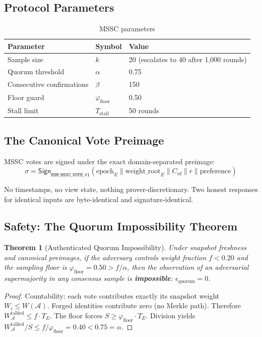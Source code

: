 \documentclass[11pt, a4paper]{article}
\newtheorem{theorem}{Theorem}
\begin{document}
\subsection{Protocol Parameters}

\begin{table}[h]
\centering
\caption{MSSC parameters}
\begin{tabular}{lll}
\toprule
\textbf{Parameter} & \textbf{Symbol} & \textbf{Value} \\
\midrule
Sample size & $k$ & 20 (escalates to 40 after 1{,}000 rounds) \\
Quorum threshold & $\alpha$ & 0.75 \\
Consecutive confirmations & $\beta$ & 150 \\
Floor guard & $\varphi_{\text{floor}}$ & 0.50 \\
Stall limit & $T_{\text{stall}}$ & 50 rounds \\
\bottomrule
\end{tabular}
\end{table}

\subsection{The Canonical Vote Preimage}

MSSC votes are signed under the exact domain-separated preimage:
\begin{equation}
\sigma = \mathsf{Sign}_{\texttt{HSM\_MSSC\_VOTE\_v1}}\!\left(\text{epoch}_E \| \text{weight\_root}_E \| C_{id} \| r \| \text{preference}\right)
\end{equation}

No timestamps, no view state, nothing prover-discretionary. Two honest responses for identical inputs are byte-identical and signature-identical.

\subsection{Safety: The Quorum Impossibility Theorem}

\begin{theorem}[Authenticated Quorum Impossibility]
\label{thm:quorum}
Under snapshot freshness and canonical preimages, if the adversary controls weight fraction $f < 0.20$ and the sampling floor is $\varphi_{\text{floor}} = 0.50 > f/\alpha$, then the observation of an adversarial supermajority in any consensus sample is \textbf{impossible}: $\epsilon_{\text{quorum}} = 0$.
\end{theorem}
\begin{proof}
Countability: each vote contributes exactly its snapshot weight $W_i \le W(\mathcal{A})$. Forged identities contribute zero (no Merkle path). Therefore $W_{\mathcal{A}}^{\text{tallied}} \le f \cdot T_E$. The floor forces $S \ge \varphi_{\text{floor}} \cdot T_E$. Division yields $W_{\mathcal{A}}^{\text{tallied}} / S \le f / \varphi_{\text{floor}} = 0.40 < 0.75 = \alpha$.
\end{proof}
\end{document}
